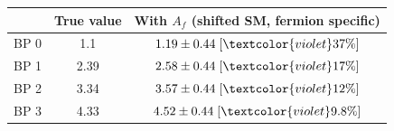 \begin{tabular}{c||c|c|}
 & True value & With $A_f$ (shifted SM, 
fermion specific)\\
\hline\hline
BP 0 & 1.1 & $1.19\pm0.44\;[\textcolor{violet}{37\%}]$\\\hline
BP 1 & 2.39 & $2.58\pm0.44\;[\textcolor{violet}{17\%}]$\\\hline
BP 2 & 3.34 & $3.57\pm0.44\;[\textcolor{violet}{12\%}]$\\\hline
BP 3 & 4.33 & $4.52\pm0.44\;[\textcolor{violet}{9.8\%}]$\\
\end{tabular}
